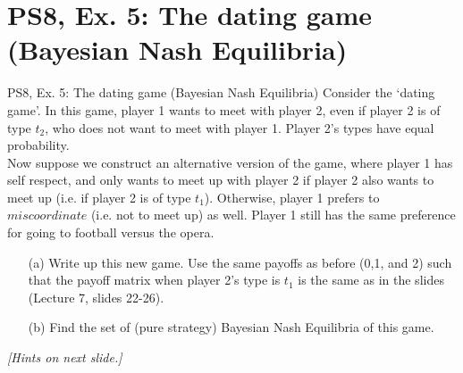 \section{PS8, Ex. 5: The dating game (Bayesian Nash Equilibria)}

\begin{frame}{PS8, Ex. 5: The dating game (Bayesian Nash Equilibria)}
    Consider the ‘dating game’. In this game, player 1 wants to meet with player 2, even if player 2 is of type $t_2$, who does not want to meet with player 1. Player 2’s types have equal probability.\\\medskip
    Now suppose we construct an alternative version of the game, where player 1 has self respect, and only wants to meet up with player 2 if player 2 also wants to meet up (i.e. if player 2 is of type $t_1$). Otherwise, player 1 prefers to $miscoordinate$ (i.e. not to meet up) as well. Player 1 still has the same preference for going to football versus the opera.
    \begin{itemize}
      \item[(a)] Write up this new game. Use the same payoffs as before (0,1, and 2) such that the payoff matrix when player 2’s type is $t_1$ is the same as in the slides (Lecture 7, slides 22-26).
      \item[(b)] Find the set of (pure strategy) Bayesian Nash Equilibria of this game.
    \end{itemize}
    \textit{[Hints on next slide.]}
    \vfill\null
\end{frame}
